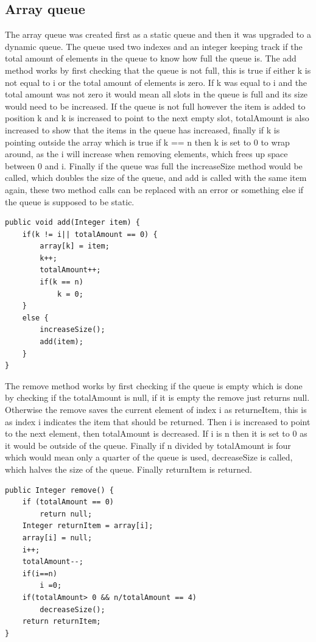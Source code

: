 \documentclass[a4paper,11pt]{article}
\begin{document}
\subsection*{Array queue}
The array queue was created first as a static queue and then it was upgraded to a dynamic queue. The queue used two indexes and an integer keeping track if the total amount of elements in the queue to know how full the queue is. The add method works by first checking that the queue is not full, this is true if either k is not equal to i or the total amount of elements is zero. 
If k was equal to i and the total amount was not zero it would mean all slots in the queue is full and its size would need to be increased. If the queue is not full however the item is added to position k and k is increased to point to the next empty slot, totalAmount is also increased to show that 
the items in the queue has increased, finally if k is pointing outside the array which is true if k == n then k is set to 0 to wrap around, as the i will increase when removing elements, which frees up space between 0 and i. Finally if the queue was full the increaseSize method would be called, which doubles the size of the queue, and add is called with the same item again, these 
two method calls can be replaced with an error or something else if the queue is supposed to be static. 
\begin{verbatim}
public void add(Integer item) {
    if(k != i|| totalAmount == 0) {
        array[k] = item;
        k++;
        totalAmount++;
        if(k == n)
            k = 0;
    }
    else {
        increaseSize();
        add(item);
    }
}
\end{verbatim}
The remove method works by first checking if the queue is empty which is done by checking if the totalAmount is null, if it is empty the remove just returns null. Otherwise the remove saves the current element of index i as returneItem, this is as index i indicates the item that should be returned. Then i is increased to point to 
the next element, then totalAmount is decreased. If i is n then it is set to 0 as it would be outside of the queue. Finally if n divided by totalAmount is four which would mean only a quarter of the queue is used, decreaseSize is called, which halves the size of the queue. Finally returnItem is returned.
\begin{verbatim}
public Integer remove() {
    if (totalAmount == 0)
        return null;
    Integer returnItem = array[i];
    array[i] = null;
    i++;
    totalAmount--;
    if(i==n) 
        i =0;
    if(totalAmount> 0 && n/totalAmount == 4)
        decreaseSize();
    return returnItem;
}
\end{verbatim}
\end{document}
